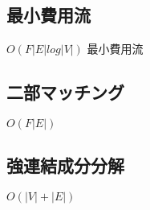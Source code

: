\subsection{最小費用流}
$O(F|E|log|V|)$
最小費用流


\subsection{二部マッチング}
$O(F|E|)$


\subsection{強連結成分分解}
$O(|V|+|E|)$


